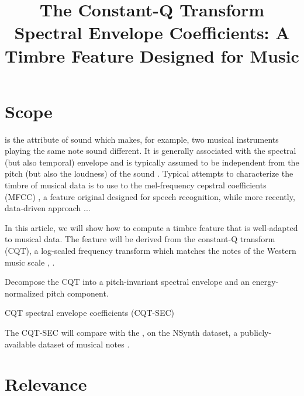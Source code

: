 \documentclass[journal]{IEEEtran}
\begin{document}
\title{The Constant-Q Transform Spectral Envelope Coefficients: A Timbre Feature Designed for Music}

\maketitle


\section{Scope}

 is the attribute of sound which makes, for example, two musical instruments playing the same note sound different. It is generally associated with the spectral (but also temporal) envelope and is typically assumed to be independent from the pitch (but also the loudness) of the sound \cite{moore2004}. Typical attempts to characterize the timbre of musical data is to use to the mel-frequency cepstral coefficients (MFCC) \cite{davis1980}, a feature original designed for speech recognition, while more recently, data-driven approach ...


In this article, we will show how to compute a timbre feature that is well-adapted to musical data. The feature will be derived from the constant-Q transform (CQT), a log-scaled frequency transform which matches the notes of the Western music scale \cite{brown1991}, \cite{brown1992}.

Decompose the CQT into a pitch-invariant spectral envelope and an energy-normalized pitch component. 

CQT spectral envelope coefficients (CQT-SEC)


The CQT-SEC will compare with the , on the NSynth dataset, a publicly-available dataset of musical notes \cite{engel2017}.





\section{Relevance}



\end{document}
